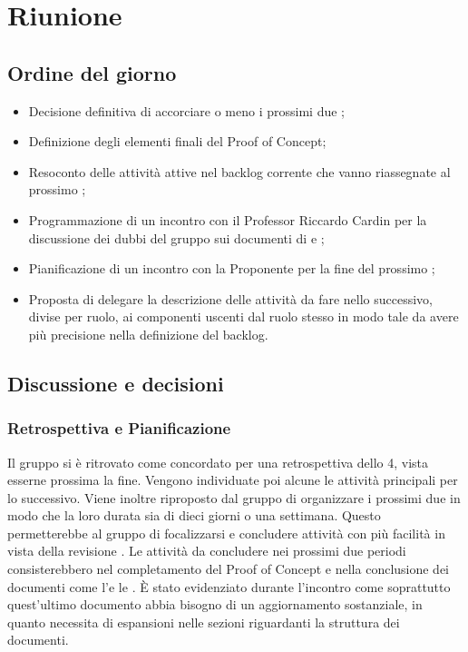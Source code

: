\section{Riunione}
\subsection{Ordine del giorno}
\begin{itemize}
	\item Decisione definitiva di accorciare o meno i prossimi  due ;
	\item Definizione degli elementi finali del Proof of Concept;
	\item Resoconto delle attività attive nel backlog corrente che vanno riassegnate al prossimo ;
	\item Programmazione di un incontro con il Professor Riccardo Cardin per la discussione dei dubbi del gruppo sui documenti di \AdR e \PdQ;
	\item Pianificazione di un incontro con la Proponente per la fine del prossimo ;
	\item Proposta di delegare la descrizione delle attività da fare nello  successivo, divise per ruolo, ai componenti uscenti dal ruolo stesso in modo tale da avere più precisione nella definizione del backlog.
\end{itemize}

\subsection{Discussione e decisioni}
\subsubsection{Retrospettiva e Pianificazione}
\par Il gruppo si è ritrovato come concordato per una retrospettiva dello  4, vista esserne prossima la fine. Vengono individuate poi alcune le attività principali per lo  successivo.
Viene inoltre riproposto dal gruppo di organizzare i prossimi due  in modo che la loro durata sia di dieci giorni o una settimana.
Questo permetterebbe al gruppo di focalizzarsi e concludere attività con più facilità in vista della revisione \RTB.
Le attività da concludere nei prossimi due periodi consisterebbero nel completamento del Proof of Concept e nella conclusione dei documenti come l'\AdR e le \NdP.
È stato evidenziato durante l'incontro come soprattutto quest'ultimo documento abbia bisogno di un aggiornamento sostanziale, in quanto necessita di espansioni nelle sezioni riguardanti la struttura dei documenti.


